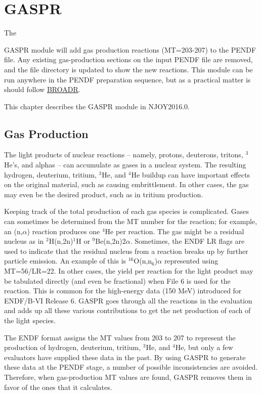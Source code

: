 \section{GASPR}
\label{sGASPR}

\hypertarget{sGASPRhy}{The}
GASPR module will add gas production
reactions (MT=203-207) to the PENDF file.  Any existing
gas-production sections on the input PENDF file are removed, and the
file directory is updated to show the new reactions.  This module can
be run anywhere in the PENDF preparation sequence, but as a practical
matter is should follow \hyperlink{sBROADRhy}{BROADR}.

This chapter describes the GASPR module in NJOY2016.0.

\subsection{Gas Production}
\label{ssGASPR_prod}

The light products of nuclear reactions -- namely, protons, deuterons,
tritons, $^{3}$He's, and alphas -- can accumulate as gases in a nuclear
system.  The resulting hydrogen, deuterium, tritium, $^{3}$He, and $^{4}$He
buildup can have important effects on the original material, such as
causing embrittlement.  In other cases, the gas may even be the desired
product, such as in tritium production.

Keeping track of the total production of each gas species is complicated.
Gases can sometimes be determined from the MT number for the reaction;
for example, an (n,$\alpha$) reaction produces one $^4$He per reaction.
The gas might be a residual nucleus as in $^2$H(n,2n)$^1$H or
$^9$Be(n,2n)2$\alpha$.  Sometimes, the ENDF LR flags are used to
indicate that the residual nucleus from a reaction breaks up by further
particle emission.  An example of this is $^{16}$O(n,n$_6$)$\alpha$
represented using MT=56/LR=22. In other cases, the yield per reaction for
the light product may be tabulated directly (and even be fractional)
when File 6 is used for the reaction.  This is common for the
high-energy data (150 MeV) introduced for ENDF/B-VI Release 6.
GASPR goes through all the reactions in the evaluation and adds up
all these various contributions to get the net production of each
of the light species.

The ENDF format assigns the MT values from 203 to 207 to represent
the production of hydrogen, deuterium, tritium, $^{3}$He, and $^{4}$He,
but only a few evaluators have supplied these data in the past.
By using GASPR to generate these data at the PENDF stage, a number
of possible inconsistencies are avoided.  Therefore, when gas-production
MT values are found, GASPR removes them in favor of the ones that it
calculates.

